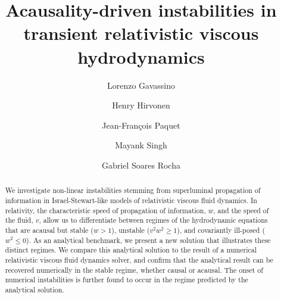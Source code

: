\documentclass[aps, prd, showkeys,superscriptaddress, nofootinbib,floatfix]{revtex4-2}
\begin{document}
\title{Acausality-driven instabilities in transient relativistic viscous hydrodynamics}


\author{Lorenzo Gavassino}

\author{Henry Hirvonen}

\author{Jean-François Paquet}

\author{Mayank Singh}

\author{Gabriel Soares Rocha}


\begin{abstract}
We investigate non-linear instabilities stemming from superluminal propagation of information in Israel-Stewart-like models of relativistic viscous fluid dynamics. In relativity, the characteristic speed of propagation of information, $w$, and the speed of the fluid, $v$, allow us to differentiate between regimes of the hydrodynamic equations that are acausal but stable ($w>1$), unstable ($v^{2} w^{2} \geq 1$), and covariantly ill-posed ($w^{2} \leq 0$). As an analytical benchmark, we present a new solution that illustrates these distinct regimes.
We compare this analytical solution to the result of a numerical relativistic viscous fluid dynamics solver, and confirm that the analytical result can be recovered numerically in the stable regime, whether causal or acausal. The onset of numerical instabilities is further found to occur in the regime predicted by the analytical solution.    
\end{abstract}



\maketitle
\end{document}
